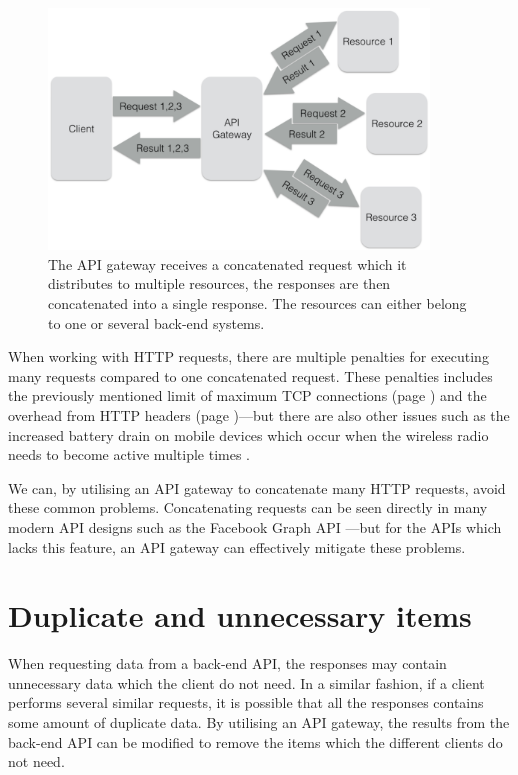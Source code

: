\documentclass{cslthse-msc}
\begin{document}
\begin{figure}[H]
  \centering
    \begin{center}
      \includegraphics[width=0.9\textwidth]{images/api_gateway_concatenation.png}
    \end{center}
  \caption{The API gateway receives a concatenated request which it distributes to multiple resources, the responses are then concatenated into a single response. The resources can either belong to one or several back-end systems.}
\end{figure}

When working with HTTP requests, there are multiple penalties for executing many requests compared to one concatenated request. These penalties includes the previously mentioned limit of maximum TCP connections (page \pageref{max_tcp}) and the overhead from HTTP headers (page \pageref{headers})---but there are also other issues such as the increased battery drain on mobile devices which occur when the wireless radio needs to become active multiple times \cite{battery}.

We can, by utilising an API gateway to concatenate many HTTP requests, avoid these common problems. Concatenating requests can be seen directly in many modern API designs such as the Facebook Graph API \cite{facebook_batch_requests}---but for the APIs which lacks this feature, an API gateway can effectively mitigate these problems.

\section{Duplicate and unnecessary items}
When requesting data from a back-end API, the responses may contain unnecessary data which the client do not need. In a similar fashion, if a client performs several similar requests, it is possible that all the responses contains some amount of duplicate data. By utilising an API gateway, the results from the back-end API can be modified to remove the items which the different clients do not need.
\end{document}
